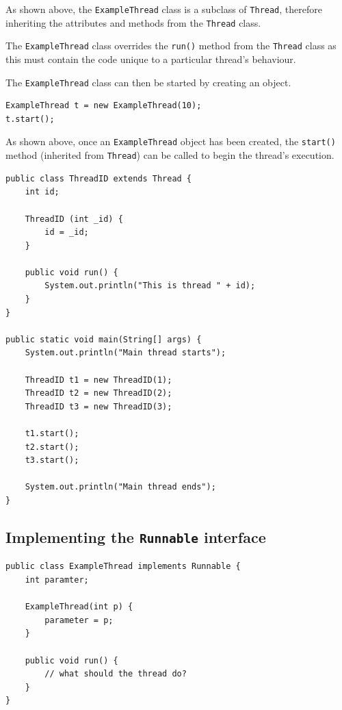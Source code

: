 \documentclass[a4paper]{systems-software}
\begin{document}
As shown above, the \texttt{ExampleThread} class is a subclass of \texttt{Thread}, therefore inheriting the attributes and methods from the \texttt{Thread} class.

The \texttt{ExampleThread} class overrides the \texttt{run()} method from the \texttt{Thread} class as this must contain the code unique to a particular thread's behaviour.

The \texttt{ExampleThread} class can then be started by creating an object.

\begin{lstlisting}[title={Creating an instance of ExampleThread.}]
ExampleThread t = new ExampleThread(10);
t.start();
\end{lstlisting}

As shown above, once an \texttt{ExampleThread} object has been created, the \texttt{start()} method (inherited from \texttt{Thread}) can be called to begin the thread's execution.

\newpage

\begin{lstlisting}[title={Example of extending the Thread class.}]
public class ThreadID extends Thread {
	int id;
	
	ThreadID (int _id) {
		id = _id;
	}
	
	public void run() {
		System.out.println("This is thread " + id);
	}
}

public static void main(String[] args) {
	System.out.println("Main thread starts");
	
	ThreadID t1 = new ThreadID(1);
	ThreadID t2 = new ThreadID(2);
	ThreadID t3 = new ThreadID(3);
	
	t1.start();
	t2.start();
	t3.start();
	
	System.out.println("Main thread ends");
}
\end{lstlisting}


\newpage

\subsection*{Implementing the \texttt{Runnable} interface}

\begin{lstlisting}[title={ExampleThread class implementing the Runnable interface.}]
public class ExampleThread implements Runnable {
	int paramter;
	
	ExampleThread(int p) {
		parameter = p;
	}
	
	public void run() {
		// what should the thread do?
	}
}
\end{lstlisting}
\end{document}
